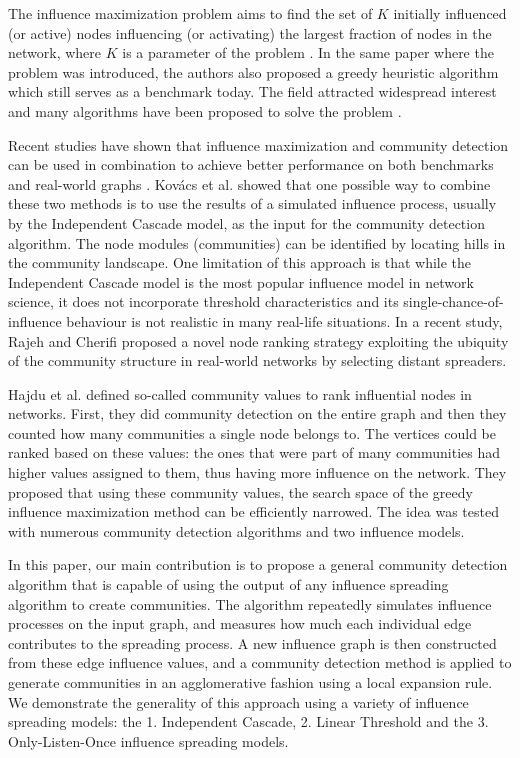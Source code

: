 \documentclass[pdflatex,sn-mathphys-ay]{sn-jnl}
\begin{document}
The influence maximization problem aims to find the set of $K$ initially influenced (or active) nodes influencing (or activating) the largest fraction of nodes in the network, where $K$ is a parameter of the problem \citep{kempe}. In the same paper where the problem was introduced, the authors also proposed a greedy heuristic algorithm which still serves as a benchmark today. The field attracted widespread interest and many algorithms have been proposed to solve the problem \citep{lisurvey}.

Recent studies have shown that influence maximization and community detection can be used in combination to achieve better performance on both benchmarks and real-world graphs \citep{csermely, rajeh, evaluating}. Kovács et al. \citep{csermely} showed that one possible way to combine these two methods is to use the results of a simulated influence process, usually by the Independent Cascade model, as the input for the community detection algorithm. The node modules (communities) can be identified by locating hills in the community landscape. One limitation of this approach is that while the Independent Cascade model is the most popular influence model in network science, it does not incorporate threshold characteristics and its single-chance-of-influence behaviour is not realistic in many real-life situations. In a recent study, Rajeh and Cherifi \citep{rajeh} proposed a novel node ranking strategy exploiting the ubiquity of the community structure in real-world networks by selecting distant spreaders.

Hajdu et al. \citep{evaluating} defined so-called community values to rank influential nodes in networks. First, they did community detection on the entire graph and then they counted how many communities a single node belongs to. The vertices could be ranked based on these values: the ones that were part of many communities had higher values assigned to them, thus having more influence on the network. They proposed that using these community values, the search space of the greedy influence maximization method can be efficiently narrowed. The idea was tested with numerous community detection algorithms and two influence models.

In this paper, our main contribution is to propose a general community detection algorithm that is capable of using the output of any influence spreading algorithm to create communities. The algorithm repeatedly simulates influence processes on the input graph, and measures how much each individual edge contributes to the spreading process. A new influence graph is then constructed from these edge influence values, and a community detection method is applied to generate communities in an agglomerative fashion using a local expansion rule. We demonstrate the generality of this approach using a variety of influence spreading models: the 1. Independent Cascade, 2. Linear Threshold and the 3. Only-Listen-Once influence spreading models.
\end{document}
